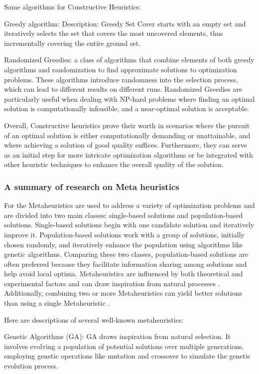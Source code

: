 \documentclass[a4paper,10pt]{article}
\begin{document}
Some algorithms for Constructive Heuristics: 

Greedy algorithm:
Description: Greedy Set Cover starts with an empty set and iteratively selects the set that covers the most uncovered elements, thus incrementally covering the entire ground set.

Randomized Greedies:  a class of algorithms that combine elements of both greedy algorithms and randomization to find approximate solutions to optimization problems. These algorithms introduce randomness into the selection process, which can lead to different results on different runs. Randomized Greedies are particularly useful when dealing with NP-hard problems where finding an optimal solution is computationally infeasible, and a near-optimal solution is acceptable.

Overall, Constructive heuristics prove their worth in scenarios where the pursuit of an optimal solution is either computationally demanding or unattainable, and where achieving a solution of good quality suffices. Furthermore, they can serve as an initial step for more intricate optimization algorithms or be integrated with other heuristic techniques to enhance the overall quality of the solution.

\subsubsection*{A summary of research on Meta heuristics}
For the 
Metaheuristics are used to address a variety of optimization problems and are divided into two main classes: single-based solutions and population-based solutions. Single-based solutions begin with one candidate solution and iteratively improve it. Population-based solutions work with a group of solutions, initially chosen randomly, and iteratively enhance the population using algorithms like genetic algorithms. Comparing these two classes, population-based solutions are often preferred because they facilitate information sharing among solutions and help avoid local optima. Metaheuristics are influenced by both theoretical and experimental factors and can draw inspiration from natural processes \cite{article}. Additionally, combining two or more Metaheuristics can yield better solutions than using a single Metaheuristic \cite{article}.

Here are descriptions of several well-known metaheuristics:

Genetic Algorithms (GA): GA draws inspiration from natural selection. It involves evolving a population of potential solutions over multiple generations, employing genetic operations like mutation and crossover to simulate the genetic evolution process.
\end{document}
